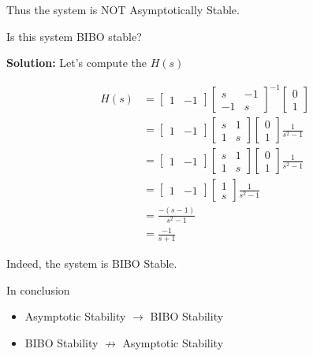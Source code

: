 \documentclass[twoside]{article}
\begin{document}
Thus the system is NOT Asymptotically Stable.

Is this system BIBO stable? 

\textbf{Solution:} Let's compute the $H(s)$

\begin{align*}
  H(s) &= \left[ \begin{array}{cc} 1 & -1 \end{array} \right]
\left[ \begin{array}{cc} s & -1 \\ -1 & s\end{array}
                                                                  \right]^{-1}
\left[ \begin{array}{c} 0 \\ 1 \end{array} \right]
\\
&=
\left[ \begin{array}{cc} 1 & -1 \end{array} \right]
\left[ \begin{array}{cc} s & 1 \\ 1 & s\end{array}
                                                                  \right]
\left[ \begin{array}{c} 0 \\ 1 \end{array} \right] \frac{1}{s^2 - 1}
\\
&=
\left[ \begin{array}{cc} 1 & -1 \end{array} \right]
\left[ \begin{array}{cc} s & 1 \\ 1 & s\end{array}
                                                                  \right]
\left[ \begin{array}{c} 0 \\ 1 \end{array} \right] \frac{1}{s^2 - 1}
\\
&=
\left[ \begin{array}{cc} 1 & -1 \end{array} \right]
\left[ \begin{array}{c} 1 \\ s \end{array} \right] \frac{1}{s^2 - 1}
\\
&= \frac{-(s-1)}{s^2 - 1} 
\\
&= \frac{-1}{s + 1} 
\end{align*}

Indeed, the system is BIBO Stable.

In conclusion

\begin{itemize}
  \item Asymptotic Stability $\rightarrow$ BIBO Stability 
  \item BIBO Stability $\not\rightarrow$ Asymptotic Stability
\end{itemize} 

\end{document}
